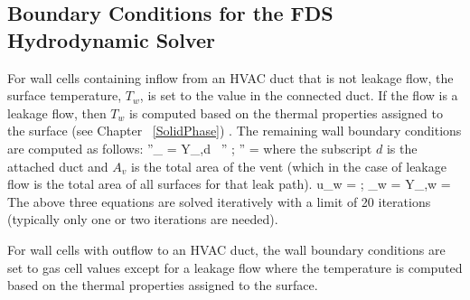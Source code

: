 \subsection{Boundary Conditions for the FDS Hydrodynamic Solver}

For wall cells containing inflow from an HVAC duct that is not leakage flow, the surface temperature, $T_w$, is set to the value in the connected duct.  If the flow is a leakage flow, then $T_w$ is computed based on the thermal properties assigned to the surface (see Chapter ~\ref{SolidPhase}) .  The remaining wall boundary conditions are computed as follows:
\be
   ''_{\alpha} = Y_{\alpha,d} \, '' \quad ; \quad {}'' = 
\ee
where the subscript $d$ is the attached duct and $A_v$ is the total area of the vent (which in the case of leakage flow is the total area of all surfaces for that leak path).
\be
   u_w =  \quad ; \quad \rho_w = 
\ee
\be
   Y_{\alpha,w} = 
\ee
The above three equations are solved iteratively with a limit of 20 iterations (typically only one or two iterations are needed).

For wall cells with outflow to an HVAC duct, the wall boundary conditions are set to gas cell values except for a leakage flow where the temperature is computed based on the thermal properties assigned to the surface.
